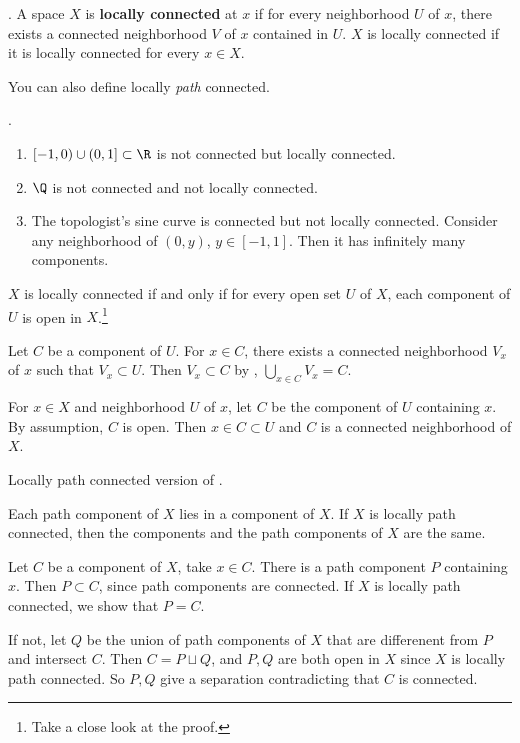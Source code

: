 .  A space \(X\) is \textbf{locally connected} at \(x\) if for every neighborhood \(U\) of \(x\), there exists a connected neighborhood \(V\) of \(x\) contained in \(U\). \(X\) is locally connected if it is locally connected for every \(x \in X\).

You can also define locally \textit{path} connected.

\ex.
\begin{enumerate}
    \item \([-1, 0) \cup (0, 1] \subset \R\) is not connected but locally connected.
    \item \(\Q\) is not connected and not locally connected.
    \item The topologist's sine curve is connected but not locally connected. Consider any neighborhood of \((0, y)\), \(y \in [-1, 1]\). Then it has infinitely many components.
\end{enumerate}

 \(X\) is locally connected if and only if for every open set \(U\) of \(X\), each component of \(U\) is open in \(X\).\footnote{Take a close look at the proof.}

\pf \note{\mimp} Let \(C\) be a component of \(U\). For \(x \in C\), there exists a connected neighborhood \(V_x\) of \(x\) such that \(V_x \subset U\). Then \(V_x \subset C\) by , \(\bigcup_{x \in C} V_x = C\).

\note{\mimpd} For \(x \in X\) and neighborhood \(U\) of \(x\), let \(C\) be the component of \(U\) containing \(x\). By assumption, \(C\) is open. Then \(x \in C \subset U\) and \(C\) is a connected neighborhood of \(X\).

 Locally path connected version of .

 Each path component of \(X\) lies in a component of \(X\). If \(X\) is locally path connected, then the components and the path components of \(X\) are the same.

\pf Let \(C\) be a component of \(X\), take \(x \in C\). There is a path component \(P\) containing \(x\). Then \(P \subset C\), since path components are connected. If \(X\) is locally path connected, we show that \(P = C\).

If not, let \(Q\) be the union of path components of \(X\) that are differenent from \(P\) and intersect \(C\). Then \(C = P \sqcup Q\), and \(P, Q\) are both open in \(X\) since \(X\) is locally path connected. So \(P, Q\) give a separation contradicting that \(C\) is connected.

